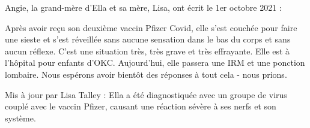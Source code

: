 Angie, la grand-mère d'Ella et sa mère, Lisa, ont écrit le 1er octobre 2021 :

Après avoir reçu son deuxième vaccin Pfizer Covid, elle s'est couchée pour faire
une sieste et s'est réveillée sans aucune sensation dans le bas du corps et sans
aucun réflexe. C'est une situation très, très grave et très effrayante. Elle est
à l'hôpital pour enfants d'OKC. Aujourd'hui, elle passera une IRM et une
ponction lombaire. Nous espérons avoir bientôt des réponses à tout cela - nous
prions.

Mis à jour par Lisa Talley : Ella a été diagnostiquée avec un groupe de virus
couplé avec le vaccin Pfizer, causant une réaction sévère à ses nerfs et son
système.
